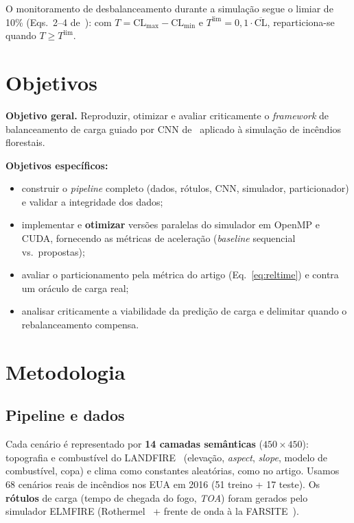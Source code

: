 \documentclass[12pt]{article}
\begin{document}
O monitoramento de desbalanceamento durante a simulação segue o limiar de 10\%
(Eqs.~2--4 de~\cite{kwon:22}): com $T = \mathrm{CL}_{\max}-\mathrm{CL}_{\min}$ e
$T^{\text{lim}} = 0{,}1\cdot\overline{\mathrm{CL}}$, reparticiona-se quando
$T \ge T^{\text{lim}}$.

\section{Objetivos}

\noindent\textbf{Objetivo geral.} Reproduzir, otimizar e avaliar criticamente o
\textit{framework} de balanceamento de carga guiado por CNN de~\cite{kwon:22}
aplicado à simulação de incêndios florestais.

\noindent\textbf{Objetivos específicos:}
\begin{itemize}
  \item construir o \textit{pipeline} completo (dados, rótulos, CNN, simulador,
    particionador) e validar a integridade dos dados;
  \item implementar e \textbf{otimizar} versões paralelas do simulador em OpenMP e
    CUDA, fornecendo as métricas de aceleração (\textit{baseline} sequencial vs.\
    propostas);
  \item avaliar o particionamento pela métrica do artigo (Eq.~\ref{eq:reltime}) e
    contra um oráculo de carga real;
  \item analisar criticamente a viabilidade da predição de carga e delimitar
    quando o rebalanceamento compensa.
\end{itemize}

\section{Metodologia}

\subsection{Pipeline e dados}

Cada cenário é representado por \textbf{14 camadas semânticas} ($450\times450$):
topografia e combustível do LANDFIRE~\cite{landfire} (elevação, \textit{aspect},
\textit{slope}, modelo de combustível, copa) e clima como constantes aleatórias,
como no artigo. Usamos 68 cenários reais de incêndios nos EUA em 2016 (51 treino +
17 teste). Os \textbf{rótulos} de carga (tempo de chegada do fogo, \textit{TOA})
foram gerados pelo simulador ELMFIRE (Rothermel~\cite{rothermel:72} + frente de
onda à la FARSITE~\cite{finney:98}).
\end{document}
